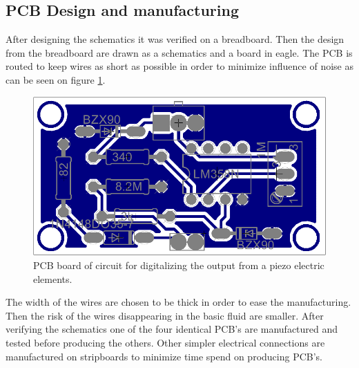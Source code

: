 \subsection{PCB Design and manufacturing}
After designing the schematics it was verified on a breadboard. Then the design from the breadboard are drawn as a schematics and a board in eagle. 
The PCB is routed to keep wires as short as possible in order to minimize influence of noise as can be seen on figure \ref{fig:pcb}.
\begin{figure}[htb]
	\centering
	\includegraphics[width=.6\textwidth]{figures/pcb}
	\caption{PCB board of circuit for digitalizing the output from a piezo electric elements.}
	\label{fig:pcb}
\end{figure}
The width of the wires are chosen to be thick in order to ease the manufacturing. Then the risk of the wires disappearing in the basic fluid are smaller. 
After verifying the schematics one of the four identical PCB's are manufactured and tested before producing the others.
Other simpler electrical connections are manufactured on stripboards to minimize time spend on producing PCB's.